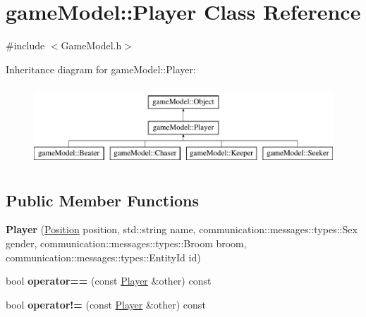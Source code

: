 \hypertarget{classgame_model_1_1_player}{\section{game\-Model\-:\-:Player Class Reference}
\label{classgame_model_1_1_player}
}


{\ttfamily \#include $<$Game\-Model.\-h$>$}

Inheritance diagram for game\-Model\-:\-:Player\-:\begin{figure}[H]
\begin{center}
\leavevmode
\includegraphics[height=3.000000cm]{classgame_model_1_1_player}
\end{center}
\end{figure}
\subsection*{Public Member Functions}
\begin{DoxyCompactItemize}
\item 
\hypertarget{classgame_model_1_1_player_a2c01b78c33c808ff91919f8af0ee7023}{{\bfseries Player} (\hyperlink{structgame_model_1_1_position}{Position} position, std\-::string name, communication\-::messages\-::types\-::\-Sex gender, communication\-::messages\-::types\-::\-Broom broom, communication\-::messages\-::types\-::\-Entity\-Id id)}\label{classgame_model_1_1_player_a2c01b78c33c808ff91919f8af0ee7023}

\item 
\hypertarget{classgame_model_1_1_player_a834398ab0d22ebed1c174cf68b8ed115}{bool {\bfseries operator==} (const \hyperlink{classgame_model_1_1_player}{Player} \&other) const }\label{classgame_model_1_1_player_a834398ab0d22ebed1c174cf68b8ed115}

\item 
\hypertarget{classgame_model_1_1_player_ae7e2df45f035fa1ea2971b21bb15b001}{bool {\bfseries operator!=} (const \hyperlink{classgame_model_1_1_player}{Player} \&other) const }\label{classgame_model_1_1_player_ae7e2df45f035fa1ea2971b21bb15b001}

\end{DoxyCompactItemize}
